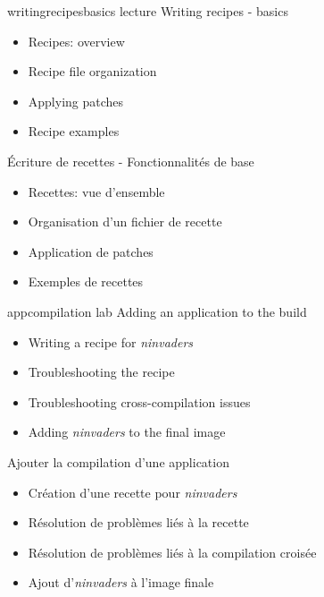 {writingrecipesbasics}
{lecture}
{Writing recipes - basics}
{
  \begin{itemize}
  \item Recipes: overview
  \item Recipe file organization
  \item Applying patches
  \item Recipe examples
  \end{itemize}
}
{Écriture de recettes - Fonctionnalités de base}
{
  \begin{itemize}
  \item Recettes: vue d'ensemble
  \item Organisation d'un fichier de recette
  \item Application de patches
  \item Exemples de recettes
  \end{itemize}
}

{appcompilation}
{lab}
{Adding an application to the build}
{
  \begin{itemize}
  \item Writing a recipe for {\em ninvaders}
  \item Troubleshooting the recipe
  \item Troubleshooting cross-compilation issues
  \item Adding {\em ninvaders} to the final image
  \end{itemize}
}
{Ajouter la compilation d'une application}
{
  \begin{itemize}
  \item Création d'une recette pour {\em ninvaders}
  \item Résolution de problèmes liés à la recette
  \item Résolution de problèmes liés à la compilation croisée
  \item Ajout d'{\em ninvaders} à l'image finale
  \end{itemize}
}

